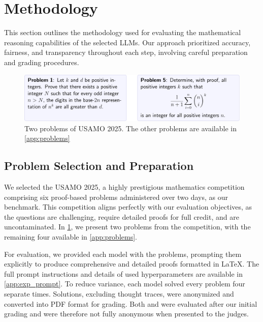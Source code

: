 \section{Methodology}\label{sec:meth}
\vspace{-1mm}
This section outlines the methodology used for evaluating the mathematical reasoning capabilities of the selected LLMs. Our approach prioritized accuracy, fairness, and transparency throughout each step, involving careful preparation and grading procedures.

\begin{figure}[t]
    \centering
    \includegraphics[width=0.95\linewidth]{figures/figure_1.pdf}
    \vspace{-2mm}
    \caption{Two problems of USAMO 2025. The other problems are available in \cref{app:problems}}
    \label{fig:problems}
    \vspace{-0.2in}
\end{figure}
\vspace{-2mm}

\subsection{Problem Selection and Preparation}
\vspace{-2mm}
We selected the USAMO 2025, a highly prestigious mathematics competition comprising six proof-based problems administered over two days, as our benchmark. This competition aligns perfectly with our evaluation objectives, as the questions are challenging, require detailed proofs for full credit, and are uncontaminated. In \cref{fig:problems}, we present two problems from the competition, with the remaining four available in \cref{app:problems}.

For evaluation, we provided each model with the problems, prompting them explicitly to produce comprehensive and detailed proofs formatted in \LaTeX. The full prompt instructions and details of used hyperparameters are available in \cref{app:exp_prompt}. To reduce variance, each model solved every problem four separate times. Solutions, excluding thought traces, were anonymized and converted into PDF format for grading. Both \grok{} and \geminipro{} were evaluated after our initial grading and were therefore not fully anonymous when presented to the judges.
\vspace{-2mm}

